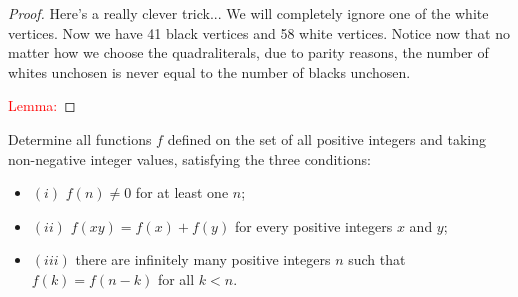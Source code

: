 \documentclass{article}
\theoremstyle{mytheoremstyle}
\theoremstyle{mytheoremstyle}
\theoremstyle{myproblemstyle}
\begin{document}
    \begin{proof}
    Here's a really clever trick... We will completely ignore one of the white vertices. Now we have 41 black vertices and 58 white vertices. Notice now that no matter how we choose the quadraliterals, due to parity reasons, the number of whites unchosen is never equal to the number of blacks unchosen. 
    
    \textcolor{red}{Lemma:} 
    \end{proof}

    \begin{problem}[2020 N5]
        Determine all functions $f$ defined on the set of all positive integers and taking non-negative integer values, satisfying the three conditions:
        \begin{itemize}
        \item $(i)$ $f(n) \neq 0$ for at least one $n$;
        \item $(ii)$ $f(x y)=f(x)+f(y)$ for every positive integers $x$ and $y$;
        \item $(iii)$ there are infinitely many positive integers $n$ such that $f(k)=f(n-k)$ for all $k<n$.
        \end{itemize}
    \end{problem}
\end{document}
